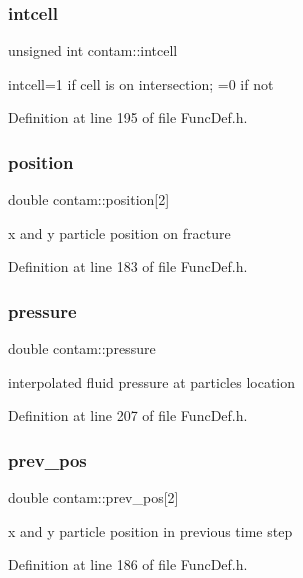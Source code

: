 \subsubsection{\texorpdfstring{intcell}{intcell}}
{\footnotesize\ttfamily unsigned int contam\+::intcell}

intcell=1 if cell is on intersection; =0 if not 

Definition at line 195 of file Func\+Def.\+h.

\mbox{\label{structcontam_afdb17185baff7dc4f22cd6c76c6fd6fd}} 
\subsubsection{\texorpdfstring{position}{position}}
{\footnotesize\ttfamily double contam\+::position\mbox{[}2\mbox{]}}

x and y particle position on fracture 

Definition at line 183 of file Func\+Def.\+h.

\mbox{\label{structcontam_a185c332f0d90695ee85c1e243085e2ba}} 
\subsubsection{\texorpdfstring{pressure}{pressure}}
{\footnotesize\ttfamily double contam\+::pressure}

interpolated fluid pressure at particles location 

Definition at line 207 of file Func\+Def.\+h.

\mbox{\label{structcontam_aacd8d2e19b4a3c689e96cf9693218777}} 
\subsubsection{\texorpdfstring{prev\_pos}{prev\_pos}}
{\footnotesize\ttfamily double contam\+::prev\+\_\+pos\mbox{[}2\mbox{]}}

x and y particle position in previous time step 

Definition at line 186 of file Func\+Def.\+h.

\mbox{\label{structcontam_aaa72e564c7052e029003076e0d8768be}} 
